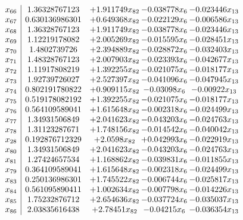 \documentclass[11pt]{article}
\begin{document}
\[\begin{array}{c| c c@{\hskip 2pt} c@{\hskip 2pt} c@{\hskip 2pt} }
 x_{66}   &  1.36328767123 & + 1.911749 x_{82} & -0.038778 x_{6} & -0.023446 x_{13}\\
 x_{67}   &  0.630136986301 & + 0.649368 x_{82} & -0.022129 x_{6} & -0.006586 x_{13}\\
 x_{68}   &  1.36328767123 & + 1.911749 x_{82} & -0.038778 x_{6} & -0.023446 x_{13}\\
 x_{69}   &  1.12219178082 & + 2.005269 x_{82} & -0.015595 x_{6} & -0.028451 x_{13}\\
 x_{70}   &  1.4802739726 & + 2.394889 x_{82} & -0.028872 x_{6} & -0.032403 x_{13}\\
 x_{71}   &  1.48328767123 & + 2.007903 x_{82} & -0.023393 x_{6} & -0.042677 x_{13}\\
 x_{72}   &  1.11917808219 & + 1.392255 x_{82} & -0.021075 x_{6} & -0.018177 x_{13}\\
 x_{73}   &  1.92739726027 & + 2.527397 x_{82} & -0.041096 x_{6} & -0.047945 x_{13}\\
 x_{74}   &  0.802191780822 & + 0.909115 x_{82} & -0.03098 x_{6} & -0.00922 x_{13}\\
 x_{75}   &  0.519178082192 & + 1.392255 x_{82} & -0.021075 x_{6} & -0.018177 x_{13}\\
 x_{76}   &  0.564109589041 & + 1.615648 x_{82} & -0.002318 x_{6} & -0.024499 x_{13}\\
 x_{77}   &  1.34931506849 & + 2.041623 x_{82} & -0.043203 x_{6} & -0.024763 x_{13}\\
 x_{78}   &  1.31123287671 & + 1.748156 x_{82} & -0.014542 x_{6} & -0.040042 x_{13}\\
 x_{28}   &  0.192876712329 & + 2.0598 x_{82} & + 0.042993 x_{6} & -0.022919 x_{13}\\
 x_{80}   &  1.34931506849 & + 2.041623 x_{82} & -0.043203 x_{6} & -0.024763 x_{13}\\
 x_{81}   &  1.27424657534 & + 1.168862 x_{82} & -0.039831 x_{6} & -0.011855 x_{13}\\
 x_{79}   &  0.364109589041 & + 1.615648 x_{82} & -0.002318 x_{6} & -0.024499 x_{13}\\
 x_{83}   &  0.250136986301 & + 1.745522 x_{82} & -0.006744 x_{6} & -0.025817 x_{13}\\
 x_{84}   &  0.561095890411 & + 1.002634 x_{82} & -0.007798 x_{6} & -0.014226 x_{13}\\
 x_{85}   &  1.75232876712 & + 2.654636 x_{82} & -0.037724 x_{6} & -0.035037 x_{13}\\
 x_{86}   &  2.03835616438 & + 2.78451 x_{82} & -0.04215 x_{6} & -0.036354 x_{13}\\

\end{array}\]
\end{document}

